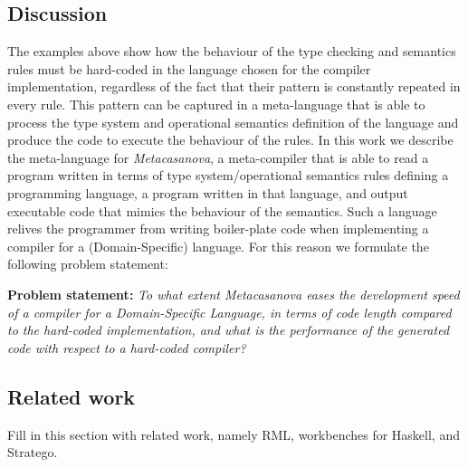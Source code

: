 \subsection{Discussion}
The examples above show how the behaviour of the type checking and semantics rules must be hard-coded in the language chosen for the compiler implementation, regardless of the fact that their pattern is constantly repeated in every rule. This pattern can be captured in a meta-language that is able to process the type system and operational semantics definition of the language and produce the code to execute the behaviour of the rules. In this work we describe the meta-language for \textit{Metacasanova}, a meta-compiler that is able to read a program written in terms of type system/operational semantics rules defining a programming language, a program written in that language, and output executable code that mimics the behaviour of the semantics. Such a language relives the programmer from writing boiler-plate code when implementing a compiler for a (Domain-Specific) language. For this reason we formulate the following problem statement:

\vspace{0.2cm}
\noindent
\textbf{Problem statement:} \textit{To what extent Metacasanova eases the development speed of a compiler for a Domain-Specific Language, in terms of code length compared to the hard-coded implementation, and what is the performance of the generated code with respect to a hard-coded compiler?}

\subsection{Related work}
Fill in this section with related work, namely RML, workbenches for Haskell, and Stratego.